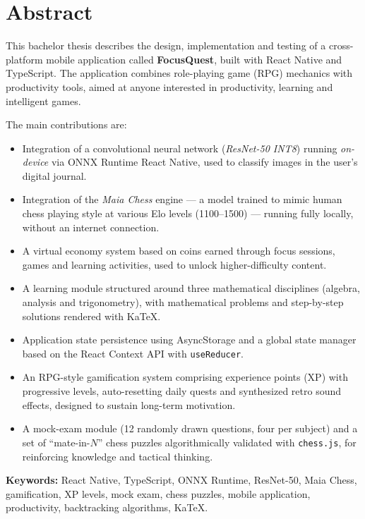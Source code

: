 \documentclass[12pt, a4paper, twoside]{report}
\numberwithin{equation}{section}
\begin{document}
\chapter*{Abstract}

This bachelor thesis describes the design, implementation and testing of a cross-platform
mobile application called \textbf{FocusQuest}, built with React Native and TypeScript.
The application combines role-playing game (RPG) mechanics with productivity tools, aimed at
anyone interested in productivity, learning and intelligent games.

The main contributions are:
\begin{itemize}[leftmargin=1.5cm]
  \item Integration of a convolutional neural network (\textit{ResNet-50 INT8}) running
    \textit{on-device} via ONNX Runtime React Native, used to classify images in the user's
    digital journal.
  \item Integration of the \textit{Maia Chess} engine — a model trained to mimic human chess
    playing style at various Elo levels (1100–1500) — running fully locally, without an
    internet connection.
  \item A virtual economy system based on coins earned through focus sessions, games and
    learning activities, used to unlock higher-difficulty content.
  \item A learning module structured around three mathematical disciplines (algebra, analysis
    and trigonometry), with mathematical problems and step-by-step
    solutions rendered with KaTeX.
  \item Application state persistence using AsyncStorage and a global state manager based on
    the React Context API with \texttt{useReducer}.
  \item An RPG-style gamification system comprising experience points (XP) with progressive
    levels, auto-resetting daily quests and synthesized retro sound effects, designed to
    sustain long-term motivation.
  \item A mock-exam module (12 randomly drawn questions, four per subject) and a set of
    ``mate-in-$N$'' chess puzzles algorithmically validated with \texttt{chess.js}, for
    reinforcing knowledge and tactical thinking.
\end{itemize}

\textbf{Keywords:} React Native, TypeScript, ONNX Runtime, ResNet-50, Maia Chess,
gamification, XP levels, mock exam, chess puzzles, mobile application, productivity,
backtracking algorithms, KaTeX.
\end{document}
